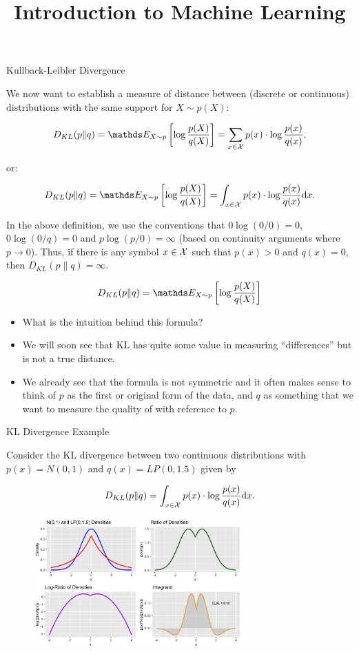 \documentclass[11pt,compress,t,notes=noshow, xcolor=table]{beamer}
\title{Introduction to Machine Learning}
\date{}
\begin{document}


\begin{vbframe} {Kullback-Leibler Divergence}

We now want to establish a measure of distance between (discrete or continuous) distributions with the same support for $X \sim p(X)$:

  $$ D_{KL}(p \| q) = \E_{X \sim p} \left[\log \frac{p(X)}{q(X)}\right] = \sum_{x \in \Xspace} p(x) \cdot \log \frac{p(x)}{q(x)}, $$
  
  or: 
  
  $$ D_{KL}(p \| q) = \E_{X \sim p} \left[\log \frac{p(X)}{q(X)}\right] = \int_{x \in \Xspace} p(x) \cdot \log \frac{p(x)}{q(x)} \mathrm{d}x. $$

In the above definition, we use the conventions that $0 \log (0/0) = 0$, $0 \log (0/q) = 0$ and $p \log(p/0) = \infty$ (based on continuity arguments where $p \to 0$). 
Thus, if there is any symbol $x \in \mathcal{X}$ such that $p(x) > 0$ and $q(x) = 0$,
then $D_{KL}(p \| q) = \infty.$
  
\framebreak

$$ D_{KL}(p \| q) = \E_{X \sim p} \left[\log \frac{p(X)}{q(X)}\right] $$

\begin{itemize}
  \item  What is the intuition behind this formula?  
  \item  We will soon see that KL has quite some value in measuring \enquote{differences} but is not a true distance. 
  \item  We already see that the formula is not symmetric and it often makes sense to think of $p$ as the first or original form of the data,
    and $q$ as something that we want to measure the quality of with reference to $p$.
  \end{itemize}

\end{vbframe}

\begin{vbframe} {KL Divergence Example}

Consider the KL divergence between two continuous distributions with $p(x)=N(0,1)$ and $q(x)=LP(0, 1.5)$ given by

  $$ D_{KL}(p \| q) = \int_{x \in \mathcal{X}} p(x) \cdot \log \frac{p(x)}{q(x)}\mathrm{d}x. $$

\begin{figure}
\includegraphics[width = 8cm ]{figure/kl_calculation_plot.png} 
\end{figure}

\end{vbframe}
\end{document}
